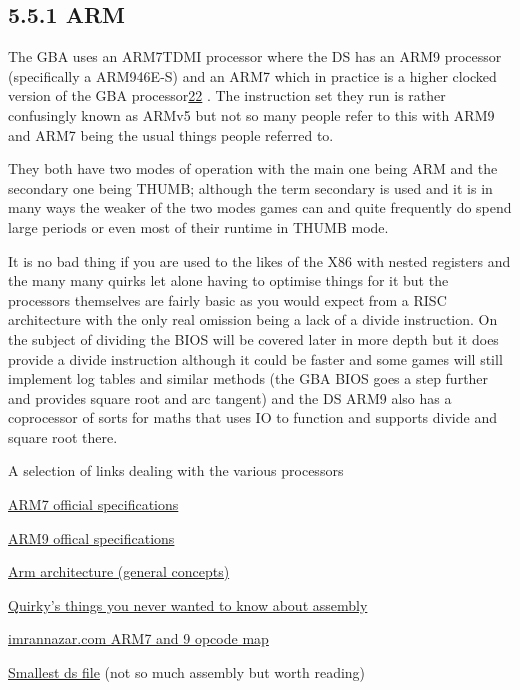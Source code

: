 \documentclass[
]{book}
\begin{document}
\hypertarget{arm}{%
\subsection{5.5.1 ARM}\label{arm}}

The GBA uses an ARM7TDMI processor where the DS has an ARM9 processor (specifically a ARM946E-S) and an ARM7 which in practice is a higher clocked version of the GBA processor\href{romhacking202023.html\#fn22x0}{22} . The instruction set they run is rather confusingly known as ARMv5 but not so many people refer to this with ARM9 and ARM7 being the usual things people referred to.

They both have two modes of operation with the main one being ARM and the secondary one being THUMB; although the term secondary is used and it is in many ways the weaker of the two modes games can and quite frequently do spend large periods or even most of their runtime in THUMB mode.

It is no bad thing if you are used to the likes of the X86 with nested registers and the many many quirks let alone having to optimise things for it but the processors themselves are fairly basic as you would expect from a RISC architecture with the only real omission being a lack of a divide instruction. On the subject of dividing the BIOS will be covered later in more depth but it does provide a divide instruction although it could be faster and some games will still implement log tables and similar methods (the GBA BIOS goes a step further and provides square root and arc tangent) and the DS ARM9 also has a coprocessor of sorts for maths that uses IO to function and supports divide and square root there.

A selection of links dealing with the various processors

\href{http://infocenter.arm.com/help/topic/com.arm.doc.ddi0210c/index.html}{ARM7 official specifications}

\href{http://infocenter.arm.com/help/topic/com.arm.doc.ddi0201d/}{ARM9 offical specifications}

\href{http://www.scss.tcd.ie/~waldroj/3d1/arm_arm.pdf}{Arm architecture (general concepts)}

\href{http://quirkygba.blogspot.com/2008/12/things-you-never-wanted-to-know-about.html}{Quirky's things you never wanted to know about assembly}

\href{http://imrannazar.com/ARM-Opcode-Map}{imrannazar.com ARM7 and 9 opcode map}

\href{http://imrannazar.com/The-Smallest-NDS-File}{Smallest ds file} (not so much assembly but worth reading)
\end{document}
